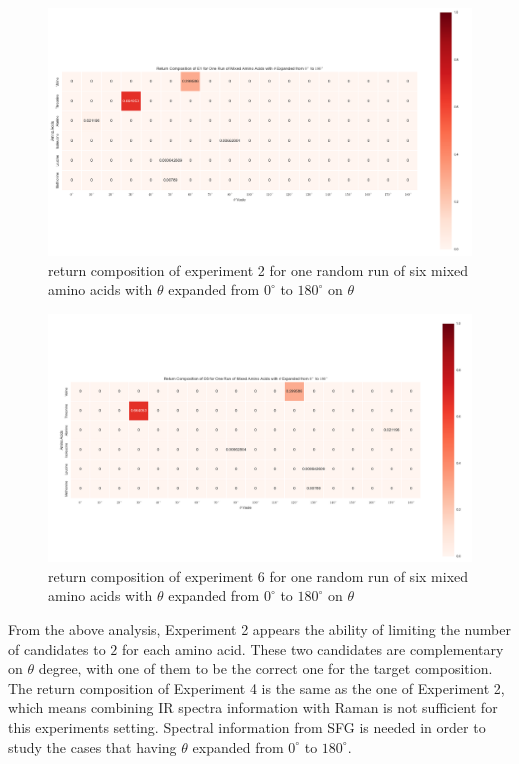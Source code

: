 \begin{figure}[!ht] 
\centering
\includegraphics[scale=0.4]{Figures/mixture_return_composition_of_E1_for_one_run_theta_0_180.png}
\caption{return composition of experiment 2 for one random run of six mixed amino acids with $\theta$ expanded from $0^{\circ}$ to $180^{\circ}$ on $\theta$} 
\label{fig:5.5}
\end{figure}

\begin{figure}[!ht] 
\centering
\includegraphics[scale=0.4]{Figures/mixture_return_composition_of_E6_for_one_run_theta_0_180.png}
\caption{return composition of experiment 6 for one random run of six mixed amino acids with $\theta$ expanded from $0^{\circ}$ to $180^{\circ}$ on $\theta$} 
\label{fig:5.6}
\end{figure}

From the above analysis, Experiment 2 appears the ability of limiting the number of candidates to $2$ for each amino acid. These two candidates are complementary on $\theta$ degree, with one of them to be the correct one for the target composition. The return composition of Experiment 4 is the same as the one of Experiment 2, which means combining IR spectra information with Raman is not sufficient for this experiments setting. Spectral information from SFG is needed in order to study the cases that having $\theta$ expanded from $0^{\circ}$ to $180^{\circ}$. \\


